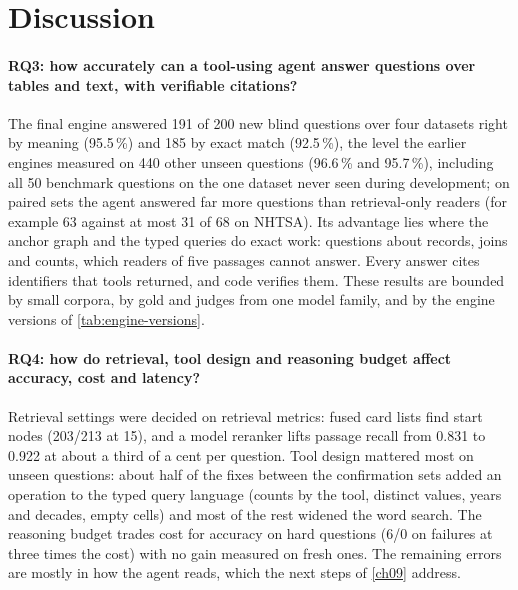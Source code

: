 \section{Discussion}\label{sec:ch07-discussion}

\paragraph{RQ3: how accurately can a tool-using agent answer questions over tables and text, with verifiable
citations?} The final engine answered 191 of 200 new blind questions over four datasets right by meaning (95.5\,\%) and
185 by exact match (92.5\,\%), the level the earlier engines measured on 440 other unseen questions (96.6\,\% and
95.7\,\%), including all 50 benchmark questions on the one dataset never seen during development; on paired sets the agent
answered far more questions than retrieval-only readers (for example 63 against at most 31 of 68 on NHTSA). Its
advantage lies where the anchor graph and the typed queries do exact work: questions about records, joins and counts,
which readers of five passages cannot answer. Every answer cites identifiers that tools returned, and code verifies
them. These results are bounded by small corpora, by gold and judges from one model family, and by the engine versions
of \cref{tab:engine-versions}.

\paragraph{RQ4: how do retrieval, tool design and reasoning budget affect accuracy, cost and latency?} Retrieval
settings were decided on retrieval metrics: fused card lists find start nodes (203/213 at 15), and a model reranker
lifts passage recall from 0.831 to 0.922 at about a third of a cent per question. Tool design mattered most on
unseen questions: about half of the fixes between the confirmation sets added an operation to the typed query
language (counts by the tool, distinct values, years and decades, empty cells) and most of the rest widened the word
search. The
reasoning budget trades cost for accuracy on hard questions (6/0 on failures at three times the cost) with no gain
measured on fresh ones. The remaining errors are mostly in how the agent reads, which the next steps of
\cref{ch09} address.
